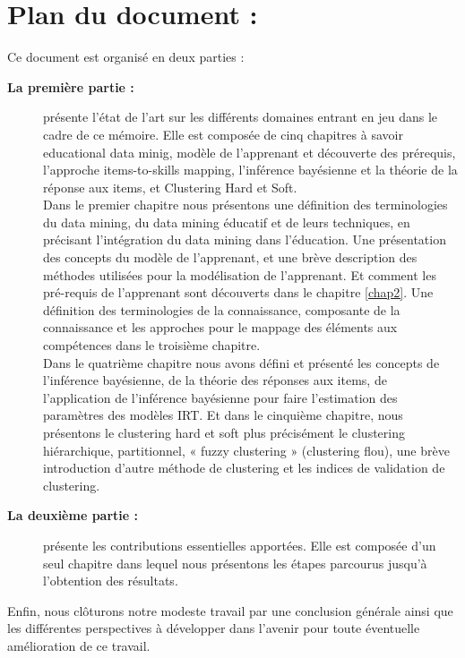 \newpage

\section*{Plan du document : }

Ce document est organisé en deux parties :

\begin{description}
    \item[\textbf{La première partie : }] présente l’état de l’art sur les différents domaines entrant en jeu dans le cadre de ce mémoire. Elle est composée de cinq chapitres à savoir educational data minig, modèle de l’apprenant et découverte des prérequis, l’approche items-to-skills mapping, l’inférence bayésienne et la théorie de la réponse aux items, et Clustering Hard et Soft. \\
    Dans le premier chapitre nous présentons une définition des terminologies du data mining, du data mining éducatif et de leurs techniques, en précisant l'intégration du data mining dans l'éducation. Une présentation des concepts du modèle de l'apprenant, et une brève description des méthodes utilisées pour la modélisation de l'apprenant. Et comment les pré-requis de l'apprenant sont découverts dans le chapitre \ref{chap2}. Une définition des terminologies de la connaissance, composante de la connaissance et les approches pour le mappage des éléments aux compétences dans le troisième chapitre. \\
    Dans le quatrième chapitre nous avons défini et présenté les concepts de l’inférence bayésienne, de la théorie des réponses aux items, de l’application de l’inférence bayésienne pour faire l’estimation des paramètres des modèles IRT. Et dans le cinquième chapitre, nous présentons le clustering hard et soft plus précisément le clustering hiérarchique, partitionnel, « fuzzy clustering » (clustering flou), une brève introduction d’autre méthode de clustering et les indices de validation de clustering.    
    
    \item[\textbf{La deuxième partie : }]présente les contributions essentielles apportées. Elle est composée d’un seul chapitre dans lequel nous présentons les étapes parcourus jusqu’à l’obtention des résultats.   
\end{description}

Enfin, nous clôturons notre modeste travail par une conclusion générale ainsi que les différentes perspectives à développer dans l’avenir pour toute éventuelle amélioration de ce travail.
